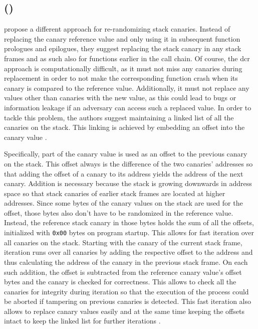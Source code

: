 \subsection{ ()}
\label{subsec:dynamic-canary-randomization}

 propose a different approach for re-randomizing stack canaries.
Instead of replacing the canary reference value and only using it in subsequent function prologues and epilogues, they suggest replacing the stack canary in any stack frames and as such also for functions earlier in the call chain.
Of course, the \gls{dcr} approach is computationally difficult, as it must not miss any canaries during replacement in order to not make the corresponding function crash when its canary is compared to the reference value.
Additionally, it must not replace any values other than canaries with the new value, as this could lead to bugs or information leakage if an adversary can access such a replaced value.
In order to tackle this problem, the authors suggest maintaining a linked list of all the canaries on the stack.
This linking is achieved by embedding an offset into the canary value \cite{Hawkins2016}.

Specifically, part of the canary value is used as an offset to the previous canary on the stack.
This offset always is the difference of the two canaries' addresses so that adding the offset of a canary to its address yields the address of the next canary.
Addition is necessary because the stack is growing downwards in address space so that stack canaries of earlier stack frames are located at higher addresses.
Since some bytes of the canary values on the stack are used for the offset, those bytes also don't have to be randomized in the reference value.
Instead, the reference stack canary in those bytes holds the sum of all the offsets, initialized with \texttt{0x00} bytes on program startup.
This allows for fast iteration over all canaries on the stack.
Starting with the canary of the current stack frame, iteration runs over all canaries by adding the respective offset to the address and thus calculating the address of the canary in the previous stack frame.
On each such addition, the offset is subtracted from the reference canary value's offset bytes and the canary is checked for correctness.
This allows to check all the canaries for integrity during iteration so that the execution of the process could be aborted if tampering on previous canaries is detected.
This fast iteration also allows to replace canary values easily and at the same time keeping the offsets intact to keep the linked list for further iterations \cite{Hawkins2016}.

